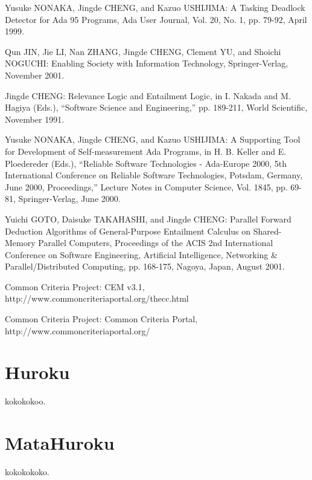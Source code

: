 \documentclass[12pt,epsf]{report}
\begin{document}
\newpage

%
%

\begin{thebibliography}{99}

Yusuke NONAKA, Jingde CHENG, and Kazuo USHIJIMA: A Tasking Deadlock
        Detector for Ada 95 Programs, Ada User Journal, Vol. 20, No. 1,
        pp. 79-92, April 1999.

Qun JIN, Jie LI, Nan ZHANG, Jingde CHENG, Clement YU, and Shoichi
        NOGUCHI: Enabling Society with Information Technology,
        Springer-Verlag, November 2001.

Jingde CHENG: Relevance Logic and Entailment Logic, in I. Nakada and
        M. Hagiya (Eds.), ``Software Science and Engineering,''
        pp. 189-211, World Scientific, November 1991.

Yusuke NONAKA, Jingde CHENG, and Kazuo USHIJIMA: A Supporting Tool for
        Development of Self-measurement Ada Programs, in H. B. Keller
        and E. Ploedereder (Eds.), ``Reliable Software Technologies -
        Ada-Europe 2000, 5th International Conference on Reliable
        Software Technologies, Potsdam, Germany, June 2000,
        Proceedings,'' Lecture Notes in Computer Science, Vol. 1845,
        pp. 69-81, Springer-Verlag, June 2000.

Yuichi GOTO, Daisuke TAKAHASHI, and Jingde CHENG: Parallel Forward
        Deduction Algorithms of General-Purpose Entailment Calculus on
        Shared-Memory Parallel Computers, Proceedings of the ACIS 2nd
        International Conference on Software Engineering, Artificial
        Intelligence, Networking \& Parallel/Distributed Computing,
        pp. 168-175, Nagoya, Japan, August 2001.


{Common Criteria Project}:
\newblock CEM v3.1,
\newblock \\http://www.commoncriteriaportal.org/thecc.html

{Common Criteria Project}:
\newblock Common Criteria Portal,
\newblock \\http://www.commoncriteriaportal.org/

\end{thebibliography}


\renewcommand{\thesection}{\Alph{section}}
\appendix
{}
\chapter{Huroku}

kokokokoo.

\chapter{MataHuroku}

kokokokoko.

%
\end{document}
